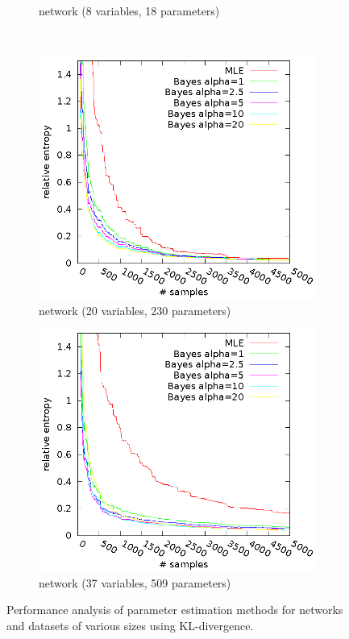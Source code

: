 \documentclass[english,cover]{fitthesis} %
\begin{document}
\begin{figure}[ht]
\begin{subfigure}[b]{0.48\linewidth}
        \caption{ network (8 variables, 18 parameters)}
    \end{subfigure}\\
    \begin{subfigure}[b]{0.5\linewidth}
        \hspace{-2.6cm}\includegraphics[scale=0.95]{fig/kl-child}
        \caption{ network (20 variables, 230 parameters)}
    \end{subfigure}
    \quad
    \begin{subfigure}[b]{0.48\linewidth}
        \hspace{-2.4cm}\includegraphics[scale=0.95]{fig/kl-icu}
        \caption{ network (37 variables, 509 parameters)}
    \end{subfigure}
    \caption{Performance analysis of parameter estimation methods for networks and datasets of various sizes using KL-divergence.}
    \label{fig:kl_div_benchmark}
\end{figure}
\end{document}
